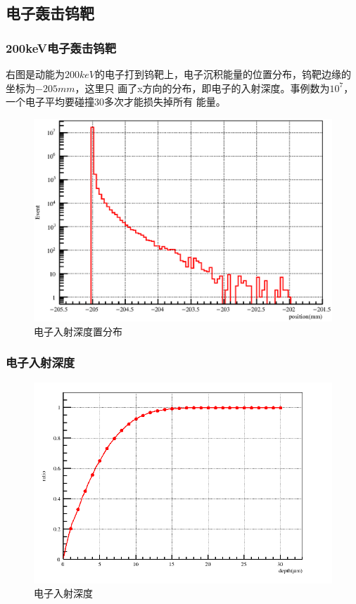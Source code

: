 \documentclass{beamer}
\newcommand{\liuhao}{\fontsize{7.875pt}{\baselineskip}\selectfont}
\newcommand{\qihao}{\fontsize{5.25pt}{\baselineskip}\selectfont}
\begin{document}
\begin{CJK*}{UTF8}{gkai}
  \section{电子轰击钨靶}
  \begin{frame}\frametitle{200keV电子轰击钨靶}
    \begin{minipage}[t]{0.2\textwidth}
      \liuhao
      右图是动能为$200keV$的电子打到钨靶上，电子沉积能量的位置分布，钨靶边缘的坐标为$-205mm$，这里只
      画了x方向的分布，即电子的入射深度。事例数为$10^7$，一个电子平均要碰撞30多次才能损失掉所有
      能量。
    \end{minipage}
    \begin{minipage}[t]{0.8\textwidth}
      \begin{figure}[ht]
	\includegraphics[width=\textwidth]{depositPosition.eps}
	\caption{\qihao 电子入射深度置分布}
      \end{figure}
    \end{minipage}
  \end{frame}
  \begin{frame}\frametitle{电子入射深度}
    \begin{figure}[ht]
      \includegraphics[width=\textwidth]{depositPositionRatio.png}
      \caption{\qihao 电子入射深度}
    \end{figure}
  \end{frame}

\end{CJK*}
\end{document}
